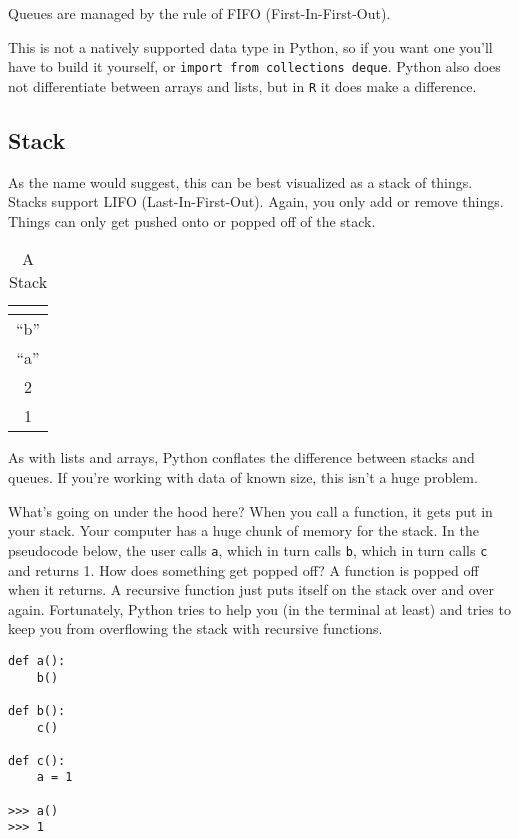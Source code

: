 \documentclass[12pt,letter]{article}
\begin{document}
Queues are managed by the rule of FIFO (First-In-First-Out).

This is not a natively supported data type in Python, so if you want
one you'll have to build it yourself, or \texttt{import from
  collections deque}. Python also does not differentiate between arrays and
lists, but in \texttt{R} it does make a difference. 

\subsection{Stack}
As the name would suggest, this can be best visualized as a stack of
things. Stacks support LIFO (Last-In-First-Out). Again, you only add
or remove things. Things can only get pushed onto or popped off of the stack. 

\begin{table}
\begin{center}
\caption{A Stack}
\label{stackfig}
\begin{tabular}{|c|}
\multicolumn{1}{c}{} \\
\hline
``b'' \\
\hline
``a'' \\
\hline
2 \\
\hline
1 \\
\hline
\end{tabular}
\end{center}
\end{table}

As with lists and arrays, Python conflates the difference between
stacks and queues. If you're working with data of known size, this
isn't a huge problem. 

What's going on under the hood here? When you call a function, it gets
put in your stack. Your computer has a huge chunk of memory for the
stack. In the pseudocode below, the user calls \texttt{a}, which in
turn calls \texttt{b}, which in turn calls \texttt{c} and returns
1. How does something get popped off? A function is popped off when it
returns. A recursive function just puts itself on the stack over and
over again.\footnotemark {} Fortunately, Python tries to help you (in the terminal at
least) and tries to keep you from overflowing the stack with recursive
functions. 

\begin{verbatim}
def a():
    b()

def b():
    c()

def c():
    a = 1

>>> a()
>>> 1
\end{verbatim}
\end{document}
